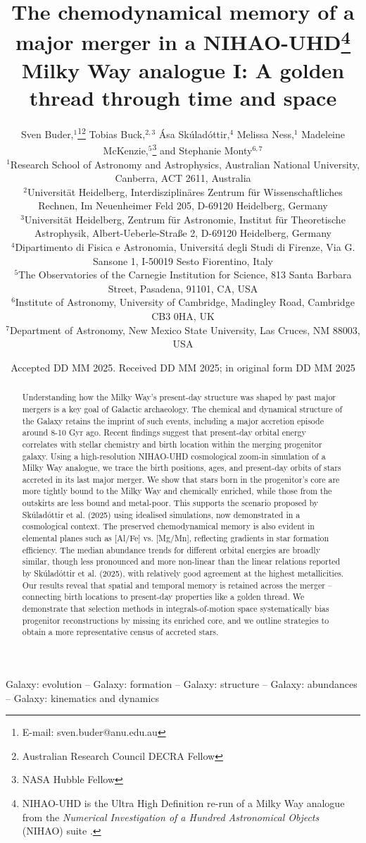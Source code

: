 \documentclass[fleqn,usenatbib]{mnras}
\title[A golden thread through time and space]{The chemodynamical memory of a major merger in a NIHAO-UHD\thanks{NIHAO-UHD is the Ultra High Definition re-run of a Milky Way analogue from the \textit{Numerical Investigation of a Hundred Astronomical Objects} (NIHAO) suite \citep{Wang2015}.} Milky Way analogue I: A golden thread through time and space}
\author[S. Buder et al.]{Sven Buder,$^{1}$\thanks{E-mail: sven.buder@anu.edu.au}\thanks{Australian Research Council DECRA Fellow}\orcidlink{0000-0002-4031-8553}
Tobias Buck,$^{2,3}$\orcidlink{0000-0003-2027-399X}
Ása Skúladóttir,$^{4}$\orcidlink{0000-0001-9155-9018}
Melissa Ness,$^{1}$\orcidlink{0000-0001-5082-6693}
Madeleine McKenzie,$^{5}$\thanks{NASA Hubble Fellow}\orcidlink{0000-0002-1715-1257}
and\newauthor
Stephanie Monty$^{6, 7}$\orcidlink{0000-0002-9225-5822}
\\
$^{1}$Research School of Astronomy and Astrophysics, Australian National University, Canberra, ACT 2611, Australia\\
$^{2}$Universit{\"a}t Heidelberg, Interdisziplin{\"a}res Zentrum f{\"u}r Wissenschaftliches Rechnen, Im Neuenheimer Feld 205, D-69120 Heidelberg, Germany\\
$^{3}$Universit{\"a}t Heidelberg, Zentrum f{\"u}r Astronomie, Institut f{\"u}r Theoretische Astrophysik, Albert-Ueberle-Straße 2, D-69120 Heidelberg, Germany\\
$^{4}$Dipartimento di Fisica e Astronomia, Universitá degli Studi di Firenze, Via G. Sansone 1, I-50019 Sesto Fiorentino, Italy\\
$^{5}$The Observatories of the Carnegie Institution for Science, 813 Santa Barbara Street, Pasadena, 91101, CA, USA\\
$^{6}$Institute of Astronomy, University of Cambridge, Madingley Road, Cambridge CB3 0HA, UK\\
$^{7}$Department of Astronomy, New Mexico State University, Las Cruces, NM 88003, USA
}
\date{Accepted DD MM 2025. Received DD MM 2025; in original form DD MM 2025}
\begin{document}
\label{firstpage}
\pagerange{\pageref{firstpage}--\pageref{lastpage}}
\maketitle

\begin{abstract} %
Understanding how the Milky Way's present-day structure was shaped by past major mergers is a key goal of Galactic archaeology. The chemical and dynamical structure of the Galaxy retains the imprint of such events, including a major accretion episode around 8-10 Gyr ago. Recent findings suggest that present-day orbital energy correlates with stellar chemistry and birth location within the merging progenitor galaxy. Using a high-resolution NIHAO-UHD cosmological zoom-in simulation of a Milky Way analogue, we trace the birth positions, ages, and present-day orbits of stars accreted in its last major merger. We show that stars born in the progenitor's core are more tightly bound to the Milky Way and chemically enriched, while those from the outskirts are less bound and metal-poor. This supports the scenario proposed by Sk\'ulad\'ottir et al. (2025) using idealised simulations, now demonstrated in a cosmological context. The preserved chemodynamical memory is also evident in elemental planes such as [Al/Fe] vs. [Mg/Mn], reflecting gradients in star formation efficiency. The median abundance trends for different orbital energies are broadly similar, though less pronounced and more non-linear than the linear relations reported by Sk\'ulad\'ottir et al. (2025), with relatively good agreement at the highest metallicities. Our results reveal that spatial and temporal memory is retained across the merger -- connecting birth locations to present-day properties like a golden thread. We demonstrate that selection methods in integrals-of-motion space systematically bias progenitor reconstructions by missing its enriched core, and we outline strategies to obtain a more representative census of accreted stars.
\end{abstract}

\begin{keywords}
Galaxy: evolution -- Galaxy: formation -- Galaxy: structure -- Galaxy: abundances -- Galaxy: kinematics and dynamics
\end{keywords}

\end{document}
